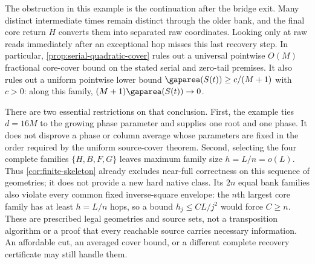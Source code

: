 The obstruction in this example is the continuation after the bridge
exit.  Many distinct intermediate times remain distinct through the
older bank, and the final core return $H$ converts them into separated
raw coordinates.  Looking only at raw reads immediately after an
exceptional hop misses this last recovery step.  In particular,
\cref{prop:serial-quadratic-cover} rules out a universal pointwise
$O(M)$ fractional core-cover bound on the stated serial and zero-tail
premises.  It also rules out a uniform pointwise lower bound
$\gaparea(S(t))\ge c/(M+1)$ with $c>0$: along this family,
$(M+1)\gaparea(S(t))\to0$.

There are two essential restrictions on that conclusion.  First, the
example ties $d=16M$ to the growing phase parameter and supplies one
root and one phase.  It does not disprove a phase or column average
whose parameters are fixed in the order required by the uniform
source-cover theorem.  Second, selecting the four complete families
$\{H,B,F,G\}$ leaves maximum family size $h=L/n=o(L)$.
Thus \cref{cor:finite-skeleton} already excludes near-full correctness
on this sequence of geometries; it does not provide a new hard native
class.  Its $2n$ equal bank families also violate every common fixed
inverse-square envelope: the $n$th largest core family has at least
$h=L/n$ hops, so a bound $h_j\le CL/j^2$ would force $C\ge n$.
These are prescribed legal geometries and source sets, not a
transposition algorithm or a proof that every reachable source carries
necessary information.  An affordable cut, an averaged cover bound,
or a different complete recovery certificate may still handle them.
